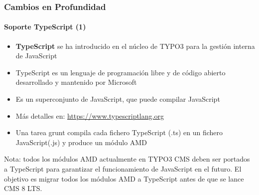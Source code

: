 \begin{frame}[fragile]
	\frametitle{Cambios en Profundidad}
	\framesubtitle{Soporte TypeScript (1)}

	\begin{itemize}
		\item \textbf{TypeScript} se ha introducido en el núcleo de TYPO3 para la gestión interna de JavaScript
		\item TypeScript es un lenguaje de programación libre y de código abierto desarrollado y mantenido por Microsoft
		\item Es un superconjunto de JavaScript, que puede compilar JavaScript
		\item Más detalles en: \url{https://www.typescriptlang.org}
		\item Una tarea grunt compila cada fichero TypeScript (.ts) en un fichero JavaScript(.js) y produce un módulo AMD
	\end{itemize}

	\small
		Nota: todos los módulos AMD actualmente en TYPO3 CMS deben ser portados a TypeScript para garantizar el funcionamiento de JavaScript en el futuro.
		El objetivo es migrar todos los módulos AMD a TypeScript antes de que se lance CMS 8 LTS.
	\normalsize

\end{frame}


